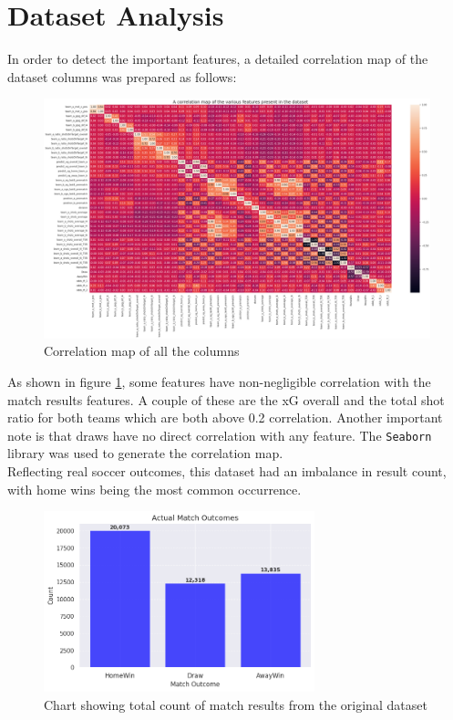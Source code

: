 \documentclass[rgb,listoffigures,listoftables,final]{cam-thesis}
\begin{document}
\section{Dataset Analysis}
    In order to detect the important features, a detailed correlation map of the dataset columns was prepared as follows:
    \begin{figure}[H]
        \centering
        \includegraphics[width=\textwidth]{figures/correlationmap.png}
        \caption{Correlation map of all the columns}
        \label{fig:correlation-map}
    \end{figure}

    As shown in figure \ref{fig:correlation-map}, some features have non-negligible correlation with the match results features. A couple of these are the xG overall and the total shot ratio for both teams which are both above 0.2 correlation. Another important note is that draws have no direct correlation with any feature. The \texttt{Seaborn} library was used to generate the correlation map.\\
    
    Reflecting real soccer outcomes, this dataset had an imbalance in result count, with home wins being the most common occurrence. 
    \begin{figure}[H]
        \centering
        \includegraphics[width=0.7\textwidth]{figures/matchoutcomes.png}
        \caption{Chart showing total count of match results from the original dataset}
        \label{fig:matchoutcomes}
    \end{figure}
\end{document}
